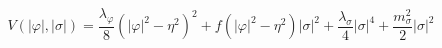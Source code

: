 \begin{equation}
V(|\varphi|,|\sigma|)= \frac{\lambda _{\varphi}}{8} 
(|\varphi|^2- \eta ^2)^2 + f(|\varphi|^2 - \eta ^2) |\sigma|^2 + 
\frac{\lambda _{\sigma}}{4}
|\sigma|^4 + \frac{m_{\sigma}^2}{2} |\sigma|^2
\end{equation}

